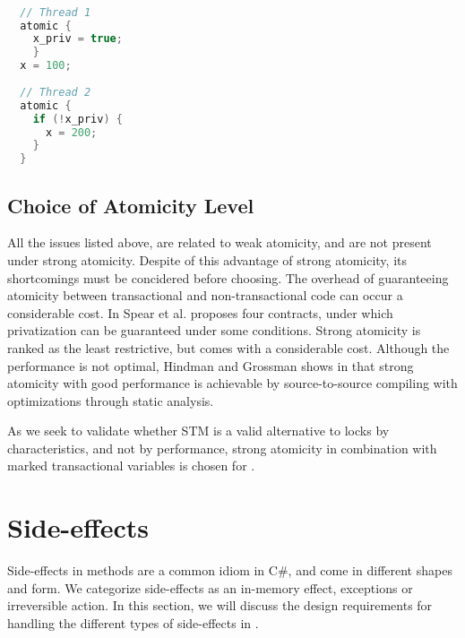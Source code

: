 \begin{lstlisting}[label=lst:privatization,
  caption={Privatization issue},
  language=Java,  
  showspaces=false,
  showtabs=false,
  breaklines=true,
  showstringspaces=false,
  breakatwhitespace=true,
  commentstyle=\color{greencomments},
  keywordstyle=\color{bluekeywords},
  stringstyle=\color{redstrings},
  morekeywords={atomic, retry, orElse, var, get, set}]  % Start your code-block

  // Thread 1
  atomic {
    x_priv = true;
    }
  x = 100;
  
  // Thread 2
  atomic {
    if (!x_priv) {
      x = 200;
    }
  }
\end{lstlisting}


\subsection{Choice of Atomicity Level}
All the issues listed above, are related to weak atomicity, and are not present under strong atomicity. Despite of this advantage of strong atomicity, its shortcomings must be concidered before choosing. The overhead of guaranteeing atomicity between transactional and non-transactional code can occur a considerable cost\cite{spear2007privatization}. In \cite{spear2007privatization} Spear et al. proposes four contracts, under which privatization can be guaranteed under some conditions. Strong atomicity is ranked as the least restrictive, but comes with a considerable cost. Although the performance is not optimal, Hindman and Grossman shows in \cite{hindman2006atomicity} that strong atomicity with good performance is achievable by source-to-source compiling with optimizations through static analysis.

As we seek to validate whether \ac{STM} is a valid alternative to locks by characteristics, and not by performance, strong atomicity in combination with marked transactional variables is chosen for \stmname.

\section{Side-effects}\label{sec:side-effects}
Side-effects in methods are a common idiom in C\#, and come in different shapes and form. We categorize side-effects as an in-memory effect, exceptions or irreversible action. In this section, we will discuss the design requirements for handling the different types of side-effects in \stmname.

